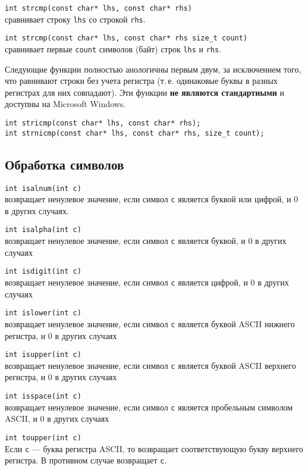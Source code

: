 \verb|int strcmp(const char* lhs, const char* rhs)|\\
сравнивает строку \verb|lhs| со строкой \verb|rhs|.

\verb|int strcmp(const char* lhs, const char* rhs size_t count)|\\
сравнивает первые \verb|count| символов (байт) строк \verb|lhs| и \verb|rhs|.

\hspace{1cm}

Следующие функции полностью анологичны первым двум, за исключением того,
что равнивают строки без учета регистра (т.\,е. одинаковые буквы в разных
регистрах для них совпадают). Эти функции \textbf{не являются стандартными}
и доступны на Microsoft Windows.

\begin{verbatim}
int stricmp(const char* lhs, const char* rhs);  
int strnicmp(const char* lhs, const char* rhs, size_t count);
\end{verbatim}

\subsection*{Обработка символов}

\verb|int isalnum(int c)| \\
возвращает ненулевое значение, если символ \verb|с| является буквой или цифрой, и 0 в других случаях.

\verb|int isalpha(int c)| \\
возвращает ненулевое значение, если символ \verb|с| является буквой, и 0 в других случаях

\verb|int isdigit(int c)| \\
возвращает ненулевое значение, если символ \verb|с| является цифрой, и 0 в других случаях

\verb|int islower(int c)| \\
возвращает ненулевое значение, если символ \verb|с| является буквой ASCII нижнего регистра, и 0 в других случаях

\verb|int isupper(int c)| \\
возвращает ненулевое значение, если символ \verb|с| является буквой ASCII верхнего регистра, и 0 в других случаях

\verb|int isspace(int c)| \\
возвращает ненулевое значение, если символ \verb|с| является пробельным символом ASCII, и 0 в других случаях

\verb|int toupper(int c)| \\
Если \verb|c| --- буква регистра ASCII, то возвращает соответствующую букву верхнего регистра. В противном
случае возвращает \verb|c|.

